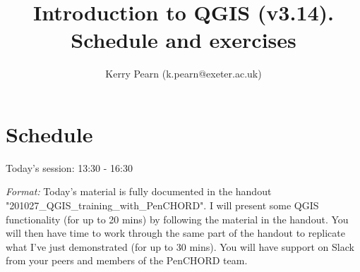 \documentclass{article}
\title{Introduction to QGIS (v3.14).\\
	\vspace{0.5cm}
	\large{Schedule and exercises}}
\author[1]{Kerry Pearn (k.pearn@exeter.ac.uk)}
\begin{document}
	
\maketitle
	
\section{Schedule} 
	
Today's session: 13:30 - 16:30

\emph{Format:} Today's material is fully documented in the handout "201027\_QGIS\_training\_with\_PenCHORD". I will present some QGIS functionality (for up to 20 mins) by following the material in the handout. You will then have time to work through the same part of the handout to replicate what I've just demonstrated (for up to 30 mins). You will have support on Slack from your peers and members of the PenCHORD team. %
\end{document}
